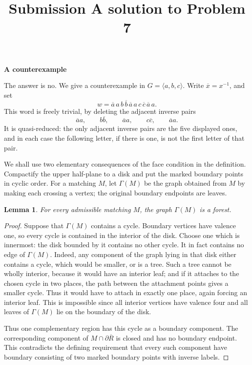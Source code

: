 \documentclass[12pt]{article}
\newtheorem{lemma}{Lemma}
\newcommand{\ol}{\overline}
\begin{document}
\title{Submission A solution to Problem 7}
\date{}
\maketitle

\begin{center}
\textbf{A counterexample}
\end{center}

The answer is no.  We give a counterexample in
\(G=\langle a,b,c\rangle\).  Write \(\ol x=x^{-1}\), and set
\[
        w=\ol a\,a\, b\,\ol b\,\ol a\,a\, c\,\ol c\,\ol a\,a .
\]
This word is freely trivial, by deleting the adjacent inverse pairs
\[
        \ol a a,\qquad b\ol b,\qquad \ol a a,\qquad c\ol c,\qquad
        \ol a a .
\]
It is quasi-reduced: the only adjacent inverse pairs are the five
displayed ones, and in each case the following letter, if there is one,
is not the first letter of that pair.

We shall use two elementary consequences of the face condition in the
definition.  Compactify the upper half-plane to a disk and put the
marked boundary points in cyclic order.  For a matching \(M\), let
\(\Gamma(M)\) be the graph obtained from \(M\) by making each crossing a
vertex; the original boundary endpoints are leaves.

\begin{lemma}
For every admissible matching \(M\), the graph \(\Gamma(M)\) is a
forest.
\end{lemma}

\begin{proof}
Suppose that \(\Gamma(M)\) contains a cycle.  Boundary vertices have
valence one, so every cycle is contained in the interior of the disk.
Choose one which is innermost: the disk bounded by it contains no other
cycle.  It in fact contains no edge of \(\Gamma(M)\).  Indeed, any
component of the graph lying in that disk either contains a cycle, which
would be smaller, or is a tree.  Such a tree cannot be wholly interior,
because it would have an interior leaf; and if it attaches to the chosen
cycle in two places, the path between the attachment points gives a
smaller cycle.  Thus it would have to attach in exactly one place, again
forcing an interior leaf.  This is impossible since all interior vertices
have valence four and all leaves of \(\Gamma(M)\) lie on the boundary of
the disk.

Thus one complementary region has this cycle as a boundary component.
The corresponding component of
\(M\cap\partial\overline R\) is closed and has no boundary endpoint.
This contradicts the defining requirement that every such component
have boundary consisting of two marked boundary points with inverse
labels.
\end{proof}
\end{document}
